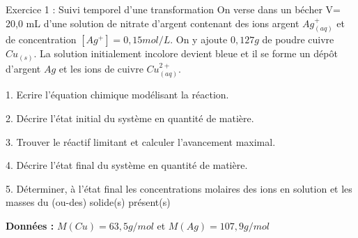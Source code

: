 \documentclass[12pt, french]{article}
\begin{document}
\begin{center}
\end{center}

\vspace{-0.2cm}
   \begin{Box2}{Exercice 1 :  Suivi temporel d’une transformation}
	   On verse dans un bécher V= 20,0 mL d’une solution de nitrate d’argent contenant des ions argent $Ag^+_{(aq)}$ et de concentration $[Ag^+] = 0,15mol/L$. On y ajoute $0,127 g$ de poudre cuivre $Cu_{(s)}$. La solution initialement incolore devient bleue et il se forme un dépôt d’argent $Ag$ et les ions de cuivre $Cu^{2+}_{(aq)}$.

1. Ecrire l’équation chimique modélisant la réaction.

2. Décrire l’état initial du système en quantité de matière.

3. Trouver le réactif limitant et calculer l’avancement maximal.

4. Décrire l’état final du système en quantité de matière.

5. Déterminer, à l’état final les concentrations molaires des ions en solution et les masses du (ou-des) solide(s) présent(s)

\textbf{Données : } $M(Cu) = 63,5g/mol$ et $M(Ag) = 107,9 g/mol$

   \end{Box2}
\end{document}
